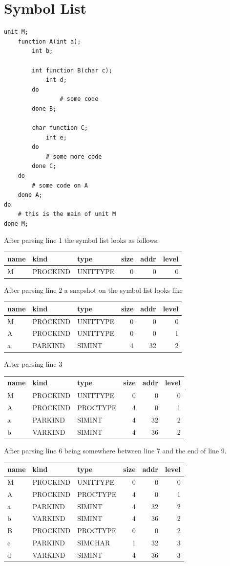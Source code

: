\documentclass[11pt]{report}
\begin{document}
\chapter{Symbol List}

\lstset{language=NoBeard, numbers=left, tabsize=2}
\begin{lstlisting}
unit M;
	function A(int a);
		int b;
		
		int function B(char c);
			int d;
		do
				# some code
		done B;
		
		char function C;
			int e;
		do
			# some more code
		done C;
	do
		# some code on A
	done A;
do
	# this is the main of unit M
done M;
\end{lstlisting}

After parsing line 1 the symbol list looks as follows:

\begin{tabular}{lllrrr}
name & kind & type & size & addr & level \\
\hline
M & PROCKIND & UNITTYPE & 0 & 0 & 0
\end{tabular}

After parsing line 2 a snapshot on the symbol list looks like

\begin{tabular}{lllrrr}
name & kind & type & size & addr & level \\
\hline
M & PROCKIND & UNITTYPE & 0 & 0 & 0 \\
A & PROCKIND & UNITTYPE & 0 & 0 & 1 \\
a & PARKIND & SIMINT & 4 & 32 & 2
\end{tabular}

After parsing line 3

\begin{tabular}{lllrrr}
name & kind & type & size & addr & level \\
\hline
M & PROCKIND & UNITTYPE & 0 & 0 & 0 \\
A & PROCKIND & PROCTYPE & 4 & 0 & 1 \\
a & PARKIND & SIMINT & 4 & 32 & 2 \\
b & VARKIND & SIMINT & 4 & 36 & 2
\end{tabular}

After parsing line 6 being somewhere between line 7 and the end of line 9.

\begin{tabular}{lllrrr}
name & kind & type & size & addr & level \\
\hline
M & PROCKIND & UNITTYPE & 0 & 0 & 0 \\
A & PROCKIND & PROCTYPE & 4 & 0 & 1 \\
a & PARKIND & SIMINT & 4 & 32 & 2 \\
b & VARKIND & SIMINT & 4 & 36 & 2 \\
B & PROCKIND & PROCTYPE & 0 & 0 & 2 \\
c & PARKIND & SIMCHAR & 1 & 32 & 3 \\
d & VARKIND & SIMINT & 4 & 36 & 3
\end{tabular}
\end{document}
